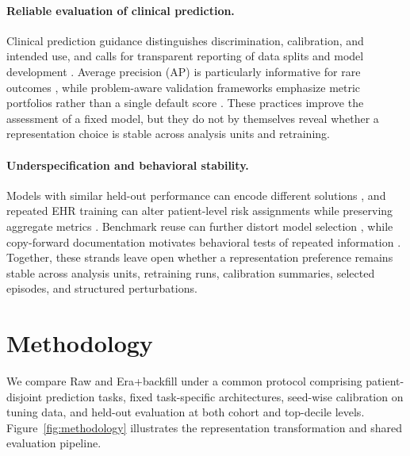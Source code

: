 \documentclass{article}
\begin{document}
\paragraph{Reliable evaluation of clinical prediction.}
Clinical prediction guidance distinguishes discrimination, calibration, and
intended use, and calls for transparent reporting of data splits and model
development \citep{vancalster2019calibration,collins2024tripod}. Average
precision (AP) is
particularly informative for rare outcomes \citep{saito2015precision}, while
problem-aware validation frameworks emphasize metric portfolios rather than a
single default score \citep{maierhein2024metrics}. These practices improve the
assessment of a fixed model, but they do not by themselves reveal whether a
representation choice is stable across analysis units and retraining.

\paragraph{Underspecification and behavioral stability.}
Models with similar held-out performance can encode different solutions
\citep{damour2022underspecification}, and repeated EHR training can alter
patient-level risk assignments while preserving aggregate metrics
\citep{lopezmartinez2022instability}. Benchmark reuse can further distort model
selection \citep{dwork2015holdout,westphal2019test,cawley2010selection}, while
copy-forward documentation motivates behavioral tests of repeated information
\citep{thornton2013copy}. Together, these strands leave open whether a
representation preference remains stable across analysis units, retraining
runs, calibration summaries, selected episodes, and structured perturbations.

\section{Methodology}

We compare Raw and Era+backfill under a common protocol comprising
patient-disjoint prediction tasks, fixed task-specific architectures,
seed-wise calibration on tuning data, and held-out evaluation at both cohort
and top-decile levels. Figure~\ref{fig:methodology} illustrates the
representation transformation and shared evaluation pipeline.
\end{document}
